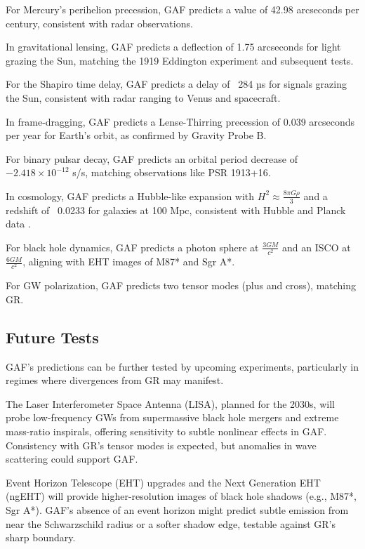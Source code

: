 \documentclass{article}
\begin{document}
For Mercury's perihelion precession, GAF predicts a value of 42.98 arcseconds per century, consistent with radar observations.

In gravitational lensing, GAF predicts a deflection of 1.75 arcseconds for light grazing the Sun, matching the 1919 Eddington experiment and subsequent tests.

For the Shapiro time delay, GAF predicts a delay of ~284 µs for signals grazing the Sun, consistent with radar ranging to Venus and spacecraft.

In frame-dragging, GAF predicts a Lense-Thirring precession of 0.039 arcseconds per year for Earth's orbit, as confirmed by Gravity Probe B.

For binary pulsar decay, GAF predicts an orbital period decrease of \( -2.418 \times 10^{-12} \) s/s, matching observations like PSR 1913+16.

In cosmology, GAF predicts a Hubble-like expansion with \( H^2 \approx \frac{8 \pi G \rho}{3} \) and a redshift of ~0.0233 for galaxies at 100 Mpc, consistent with Hubble and Planck data \cite{Riess2019}\cite{Planck2018}.

For black hole dynamics, GAF predicts a photon sphere at \( \frac{3 G M}{c^2} \) and an ISCO at ~ \( \frac{6 G M}{c^2} \), aligning with EHT images of M87* and Sgr A*.

For GW polarization, GAF predicts two tensor modes (plus and cross), matching GR.

\subsection{Future Tests}

GAF's predictions can be further tested by upcoming experiments, particularly in regimes where divergences from GR may manifest.

The Laser Interferometer Space Antenna (LISA), planned for the 2030s, will probe low-frequency GWs from supermassive black hole mergers and extreme mass-ratio inspirals, offering sensitivity to subtle nonlinear effects in GAF. Consistency with GR's tensor modes is expected, but anomalies in wave scattering could support GAF.

Event Horizon Telescope (EHT) upgrades and the Next Generation EHT (ngEHT) will provide higher-resolution images of black hole shadows (e.g., M87*, Sgr A*). GAF's absence of an event horizon might predict subtle emission from near the Schwarzschild radius or a softer shadow edge, testable against GR's sharp boundary.
\end{document}
